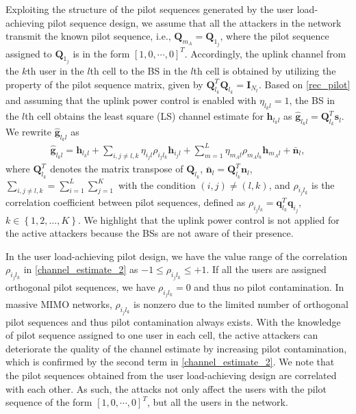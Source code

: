 \documentclass[conference]{IEEEtran}
\begin{document}
Exploiting the structure of the pilot sequences generated by the user load-achieving pilot sequence design, we assume that all the attackers in the network transmit the known pilot sequence, i.e., $\mathbf{Q}_{m_{A}} = \mathbf{Q}_{1_{j}}$, where the pilot sequence assigned to $\mathbf{Q}_{1_{j}}$ is in the form $[1,0,\cdots,0]^T$.  Accordingly, the uplink channel from the $k$th user in the $l$th cell to the BS in the $l$th cell is obtained by utilizing the property of the pilot sequence matrix, given by $\mathbf{Q}_{l_{k}}^{T}\mathbf{Q}_{l_{k}}=\mathbf{I}_{N_{t}}$. Based on \eqref{rec_pilot} and assuming that the uplink power control is enabled with $\eta_{l_{k}l}=1$, the BS in the $l$th cell obtains the least square (LS) channel estimate for $\mathbf{h}_{l_{k}l}$ as $\mathbf{\hat{g}}_{l_{k}l}=\mathbf{Q}_{l_{k}}^{T}\mathbf{s}_{l}$. We rewrite $\mathbf{\hat{g}}_{l_{k}l}$ as
\begin{align}\label{channel_estimate_2}
\mathbf{\hat{g}}_{l_{k}l}\!=\! \mathbf{h}_{l_{k}l}\!+\! \sum_{i,j \neq l,k}\eta_{i_{j}l}\rho_{i_{j}l_{k}}\mathbf{h}_{i_{j}l}\!+\! \sum_{m=1}^L\eta_{m_{A}l}\rho_{m_{A}l_{k}}\mathbf{h}_{m_{A}l} \!+\! \bar{\mathbf{n}}_{l},
\end{align}
where $\mathbf{Q}_{l_{k}}^{T}$ denotes the matrix transpose of $\mathbf{Q}_{l_{k}}$, $\bar{\mathbf{n}}_{l}={\mathbf{Q}_{l_{k}}^T}\mathbf{n}_{l}$, ${\sum}_{i,j\neq{}l,k}=\sum_{i=1}^{L}\sum_{j=1}^{K}$ with the condition $(i,j)\neq(l,k)$, and $\rho_{i_{j}l_{k}}$ is the correlation coefficient between pilot sequences, defined as $\rho_{i_{j}l_{k}}=\mathbf{q}_{l_{k}}^{T}\mathbf{q}_{i_{j}}$, $k \in \left\{1,2,\dotsc, K\right\}$. We highlight that the uplink power control is not applied for the active attackers because the BSs are not aware of their presence.

In the user load-achieving pilot design, we have the value range of the correlation $\rho_{i_{j}l_{k}}$ in \eqref{channel_estimate_2} as  $ -1 \leq \rho_{i_{j}l_{k}} \leq +1$. If all the users are assigned orthogonal pilot sequences,  we have $\rho_{i_{j}l_{k}}=0$ and thus no pilot contamination. In massive MIMO networks, $\rho_{i_{j}l_{k}}$ is nonzero due to the limited number of orthogonal pilot sequences and thus  pilot contamination always exists. With the knowledge of pilot sequence assigned to one user in each cell, the active attackers can deteriorate the quality of the channel estimate by increasing pilot contamination, which is confirmed by the second term in \eqref{channel_estimate_2}. We note that the pilot sequences obtained from the user load-achieving design are correlated with each other. As such, the attacks not only affect the users with the pilot sequence of the form $[1,0,\cdots,0]^T$, but all the users in the network.
\end{document}

